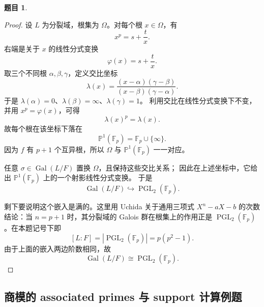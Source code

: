 \documentclass[a4paper]{ctexart}
\theoremstyle{definition}
\newtheorem{example}{题目}[section]
\theoremstyle{analysis}
\theoremstyle{plain}
\begin{document}
\begin{example}
\begin{proof}
设 \(L\) 为分裂域，根集为 \(\Omega\)。对每个根 \(x\in\Omega\)，有
\[
  x^p=s+\frac{t}{x}.
\]
右端是关于 \(x\) 的线性分式变换
\[
  \varphi(x)=s+\frac{t}{x}.
\]
取三个不同根 \(\alpha,\beta,\gamma\)，定义交比坐标
\[
  \lambda(x)
  =
  \frac{(x-\alpha)(\gamma-\beta)}
       {(x-\beta)(\gamma-\alpha)}.
\]
于是 \(\lambda(\alpha)=0\)、\(\lambda(\beta)=\infty\)、\(\lambda(\gamma)=1\)。
利用交比在线性分式变换下不变，并用 \(x^p=\varphi(x)\)，可得
\[
  \lambda(x)^p=\lambda(x).
\]
故每个根在该坐标下落在
\[
  \mathbb P^1(\mathbb F_p)=\mathbb F_p\cup\{\infty\}.
\]
因为 \(f\) 有 \(p+1\) 个互异根，所以 \(\Omega\) 与 \(\mathbb P^1(\mathbb F_p)\) 一一对应。

任意 \(\sigma\in\operatorname{Gal}(L/F)\) 置换 \(\Omega\)，且保持这些交比关系；
因此在上述坐标中，它给出 \(\mathbb P^1(\mathbb F_p)\) 上的一个射影线性分式变换。
于是
\[
  \operatorname{Gal}(L/F)\hookrightarrow \operatorname{PGL}_2(\mathbb F_p).
\]

剩下要说明这个嵌入是满的。这里用 Uchida 关于通用三项式
\(X^n-aX-b\) 的次数结论：当 \(n=p+1\) 时，其分裂域的 Galois 群在根集上的作用正是
\(\operatorname{PGL}_2(\mathbb F_p)\)。在本题记号下即
\[
  [L:F]=|\operatorname{PGL}_2(\mathbb F_p)|
  =p(p^2-1).
\]
由于上面的嵌入两边阶数相同，故
\[
  \operatorname{Gal}(L/F)\cong \operatorname{PGL}_2(\mathbb F_p).
\]
\end{proof}
\end{example}

\subsection{商模的 associated primes 与 support 计算例题}\label{subsec:problem-ass-support-kxy}
\end{document}
